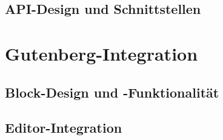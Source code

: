 \subsection{API-Design und Schnittstellen}

\section{Gutenberg-Integration}
\subsection{Block-Design und -Funktionalität}
\subsection{Editor-Integration}
